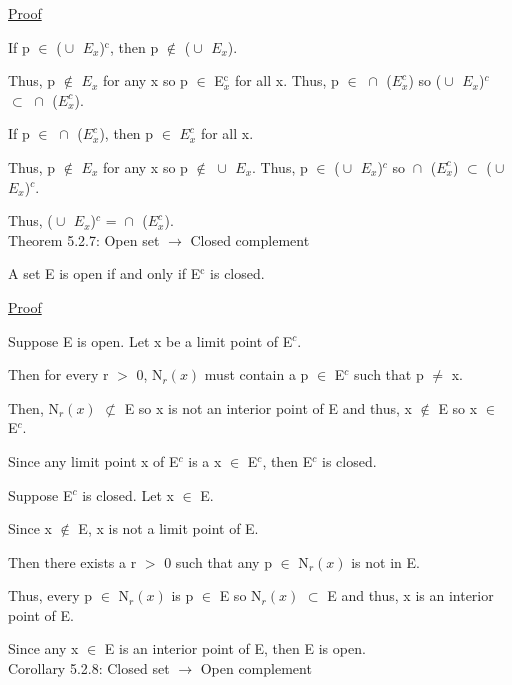 { \color{magenta} \underline{Proof} } 
	
	If p $\in$ ($\cup_{}^{}$ $E_x$)$^\text{c}$, then p $\not \in$ ($\cup_{}^{}$ $E_x$).

	Thus, p $\not \in$ $E_x$ for any x so p $\in$ E$_x^\text{c}$ for all x.
	Thus, p $\in$ $\cap_{}^{}$ ($E_x^c$) so
	($\cup_{}^{}$ $E_x$)$^c$ $\subset$ $\cap_{}^{}$ ($E_x^c$).

	If p $\in$ $\cap_{}^{}$ ($E_x^c$), then p $\in$ $E_x^c$ for all x.
	
	Thus, p $\not \in$ $E_x$ for any x so p $\not \in$ $\cup_{}^{}$ $E_x$.
	Thus, p $\in$ ($\cup_{}^{}$ $E_x$)$^c$ so
	$\cap_{}^{}$ ($E_x^c$) $\subset$ ($\cup_{}^{}$ $E_x$)$^c$.

	Thus, ($\cup_{}^{}$ $E_x$)$^c$ = $\cap_{}^{}$ ($E_x^c$). \\

{ \color{red} Theorem 5.2.7: Open set $\rightarrow$ Closed complement } 

	\begin{adjustbox}{minipage=14cm, right}
		A set E is open if and only if E$^\text{c}$ is closed.
	\end{adjustbox}

{ \color{magenta} \underline{Proof} } 

	Suppose E is open. Let x be a limit point of E$^c$.

	Then for every r $>$ 0, N$_r(x)$ must contain a p $\in$ E$^c$ such that p $\neq$ x.

	Then, N$_r(x)$ $\not \subset$ E so x is not an interior point of E and
	thus, x $\not \in$ E so x $\in$ E$^c$.

	Since any limit point x of E$^c$ is a x $\in$ E$^c$, then E$^c$ is closed.

	\vspace{0.2cm}

	Suppose E$^c$ is closed. Let x $\in$ E.

	Since x $\not \in$ E, x is not a limit point of E.

	Then there exists a r $>$ 0 such that any p $\in$ N$_r(x)$ is not in E.

	Thus, every p $\in$ N$_r(x)$ is p $\in$ E so N$_r(x)$ $\subset$ E and thus,
	x is an interior point of E.

	Since any x $\in$ E is an interior point of E, then E is open. \\

{ \color{orange} Corollary 5.2.8: Closed set $\rightarrow$ Open complement } 


